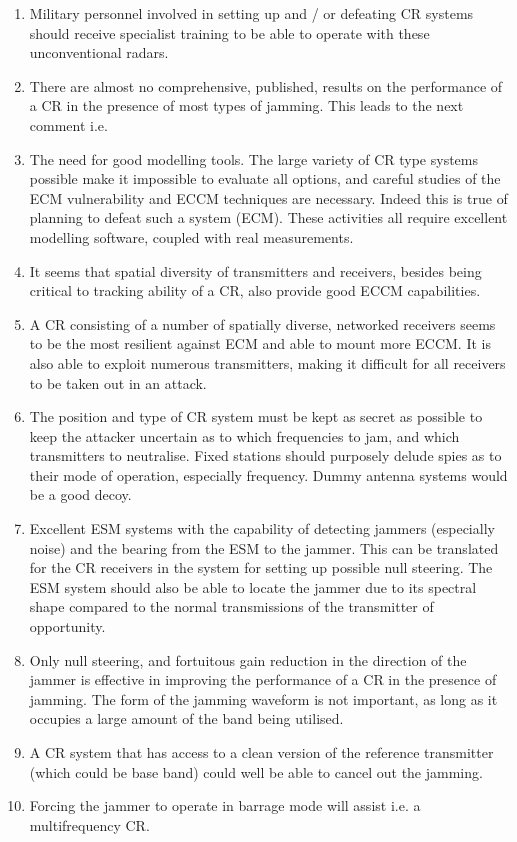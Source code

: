 \documentclass[english, 12pt]{report}
\begin{document}
\begin{enumerate}
\item Military personnel involved in setting up and / or defeating CR systems should receive specialist training to be able to operate with these unconventional radars.
\item There are almost no comprehensive, published, results on the performance of a CR in the presence of most types of jamming. This leads to the next comment i.e.
\item The need for good modelling tools. The large variety of CR type systems possible make it impossible to evaluate all options, and careful studies of the ECM vulnerability and ECCM techniques are necessary. Indeed this is true of planning to defeat such a system (ECM). These activities all require excellent modelling software, coupled with real measurements.
\item It seems that spatial diversity of transmitters and receivers, besides being critical to tracking ability of a CR, also provide good ECCM capabilities.
\item A CR consisting of a number of spatially diverse, networked receivers seems to be the most resilient against ECM and able to mount more ECCM. It is also able to exploit numerous transmitters, making it difficult for all receivers to be taken out in an attack.
\item The position and type of CR system must be kept as secret as possible to keep the attacker uncertain as to which frequencies to jam, and which transmitters to neutralise. Fixed stations should purposely delude spies as to their mode of operation, especially frequency. Dummy antenna systems would be a good decoy.
\item Excellent ESM systems with the capability of detecting jammers (especially noise) and the bearing from the ESM to the jammer. This can be translated for the CR receivers in the system for setting up possible null steering. The ESM system should also be able to locate the jammer due to its spectral shape compared to the normal transmissions of the transmitter of opportunity.
\item Only null steering, and fortuitous gain reduction in the direction of the jammer is effective in improving the performance of a CR in the presence of jamming. The form of the jamming waveform is not important, as long as it occupies a large amount of the band being utilised.
\item A CR system that has access to a clean version of the reference transmitter (which could be base band) could well be able to cancel out the jamming.
\item Forcing the jammer to operate in barrage mode will assist i.e. a multifrequency CR.

\end{enumerate}
\end{document}
